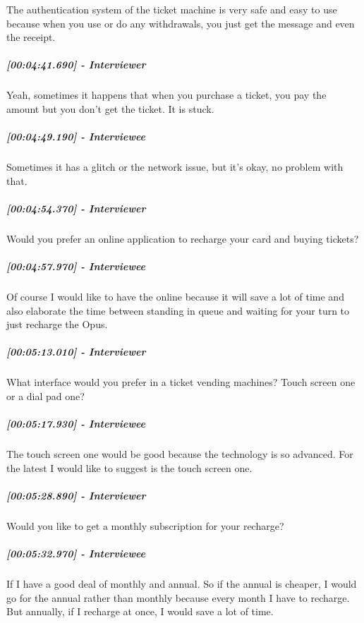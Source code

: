 \documentclass[a4paper,12pt]{article}
\begin{document}
The authentication system of the ticket machine is very safe and easy to
use because when you use or do any withdrawals, you just get the message
and even the receipt.

\hypertarget{interviewer-26}{%
\subparagraph{{[}00:04:41.690{]} - Interviewer}\label{interviewer-26}}

Yeah, sometimes it happens that when you purchase a ticket, you pay the
amount but you don't get the ticket. It is stuck.

\hypertarget{interviewee-19}{%
\subparagraph{{[}00:04:49.190{]} - Interviewee}\label{interviewee-19}}

Sometimes it has a glitch or the network issue, but it's okay, no
problem with that.

\hypertarget{interviewer-27}{%
\subparagraph{{[}00:04:54.370{]} - Interviewer}\label{interviewer-27}}

Would you prefer an online application to recharge your card and buying
tickets?

\hypertarget{interviewee-20}{%
\subparagraph{{[}00:04:57.970{]} - Interviewee}\label{interviewee-20}}

Of course I would like to have the online because it will save a lot of
time and also elaborate the time between standing in queue and waiting
for your turn to just recharge the Opus.

\hypertarget{interviewer-28}{%
\subparagraph{{[}00:05:13.010{]} - Interviewer}\label{interviewer-28}}

What interface would you prefer in a ticket vending machines? Touch
screen one or a dial pad one?

\hypertarget{interviewee-21}{%
\subparagraph{{[}00:05:17.930{]} - Interviewee}\label{interviewee-21}}

The touch screen one would be good because the technology is so
advanced. For the latest I would like to suggest is the touch screen
one.

\hypertarget{interviewer-29}{%
\subparagraph{{[}00:05:28.890{]} - Interviewer}\label{interviewer-29}}

Would you like to get a monthly subscription for your recharge?

\hypertarget{interviewee-22}{%
\subparagraph{{[}00:05:32.970{]} - Interviewee}\label{interviewee-22}}

If I have a good deal of monthly and annual. So if the annual is
cheaper, I would go for the annual rather than monthly because every
month I have to recharge. But annually, if I recharge at once, I would
save a lot of time.
\end{document}
